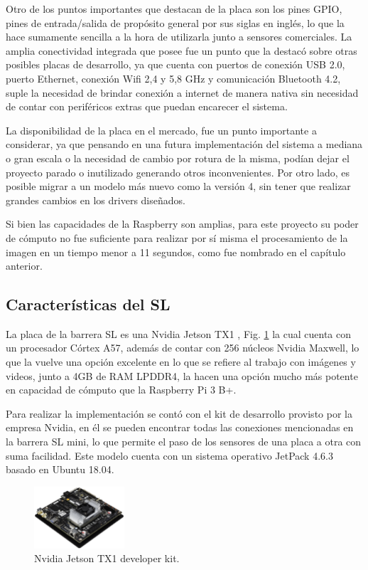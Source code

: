 Otro de los puntos importantes que destacan de la placa son los pines GPIO, pines de entrada/salida de propósito general por sus siglas en inglés, lo que la hace sumamente sencilla a la hora de utilizarla junto a sensores comerciales.
La amplia conectividad integrada que posee fue un punto que la destacó sobre otras posibles placas de desarrollo, ya que cuenta con puertos de conexión USB 2.0, puerto Ethernet, conexión Wifi 2,4 y 5,8 GHz y comunicación Bluetooth 4.2, suple la necesidad de brindar conexión a internet de manera nativa sin necesidad de contar con periféricos extras que puedan encarecer el sistema.

La disponibilidad de la placa en el mercado, fue un punto importante a considerar, ya que pensando en una futura
implementación del sistema a mediana o gran escala o la necesidad de cambio por rotura de la misma, podían dejar el
proyecto parado o inutilizado generando otros inconvenientes. Por otro lado, es posible migrar a un modelo más nuevo como la versión 4, sin tener que realizar grandes cambios en los drivers diseñados.

Si bien las capacidades de la Raspberry son amplias, para este proyecto su poder de cómputo no fue suficiente para realizar por sí misma el procesamiento de la imagen en un tiempo menor a 11 segundos, como fue nombrado en el capítulo anterior.

\subsection{Características del SL}

La placa de la barrera SL es una Nvidia Jetson TX1 \cite{nvidia_manual_nodate}, Fig. \ref{fig:JTX1} la cual cuenta con un procesador Córtex A57, además de contar con 256 núcleos Nvidia Maxwell, lo que la vuelve una opción excelente en lo que se refiere al trabajo con imágenes y videos, junto a 4GB de RAM LPDDR4, la hacen una opción mucho más potente en capacidad de cómputo que la Raspberry Pi 3 B+.

Para realizar la implementación se contó con el kit de desarrollo provisto por la empresa Nvidia, en él se pueden encontrar todas las conexiones mencionadas en la barrera SL mini, lo que permite el paso de los sensores de una placa a otra con suma facilidad.
Este modelo cuenta con un sistema operativo JetPack 4.6.3 basado en Ubuntu 18.04.

\begin{figure}
    \centering
    \includegraphics[width=0.3\textwidth]{imgs/JTX1-developerkit.png}
    \caption{Nvidia Jetson TX1 developer kit.}
    \label{fig:JTX1}
\end{figure}


